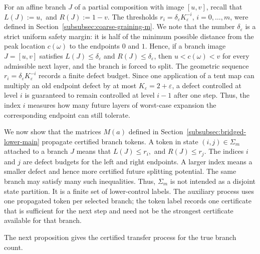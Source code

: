 \documentclass[11pt]{amsart}
\numberwithin{equation}{section}
\theoremstyle{plain}
\theoremstyle{definition}
\theoremstyle{remark}
\begin{document}
For an affine branch \(J\) of a partial composition with image \([u,v]\), recall that
\(
L(J):=u,
\)
and
\(
R(J):=1-v.
\)
The thresholds \(r_i=\delta_\varepsilon K_\varepsilon^{-i}\), \(i=0,\dots,m\), were defined in Section~\ref{subsubsec:coarse-graining-m}. We note that the number \(\delta_\varepsilon\) is a strict uniform safety margin: it is half of the minimum possible distance from the peak location \(c(\omega)\) to the endpoints \(0\) and \(1\). Hence, if a branch image \(J=[u,v]\) satisfies \(L(J)\le\delta_\varepsilon\) and \(R(J)\le\delta_\varepsilon\), then \(u<c(\omega)<v\) for every admissible next layer, and the branch is forced to split.
The geometric sequence \(r_i=\delta_\varepsilon K_\varepsilon^{-i}\) records a finite defect budget. Since one application of a tent map can multiply an old endpoint defect by at most \(K_\varepsilon=2+\varepsilon\), a defect controlled at level \(i\) is guaranteed to remain controlled at level \(i-1\) after one step. Thus, the index \(i\) measures how many future layers of worst-case expansion the corresponding endpoint can still tolerate.


We now show that the matrices \(M(a)\) defined in Section~\ref{subsubsec:bridged-lower-main} propagate certified branch tokens. A token in state \((i,j)\in\Sigma_m\) attached to a branch \(J\) means that \(
L(J)\le r_i,\)
and \(
R(J)\le r_j.\)
The indices \(i\) and \(j\) are defect budgets for the left and right endpoints. A larger index means a smaller defect and hence more certified future splitting potential.
The same branch may satisfy many such inequalities. Thus, \(\Sigma_m\) is not intended as a disjoint state partition. It is a finite set of lower-control labels. The auxiliary process uses one propagated token per selected branch; the token label records one certificate that is sufficient for the next step and need not be the strongest certificate available for that branch. 

The next proposition gives the certified transfer process for the true branch count.
\end{document}

